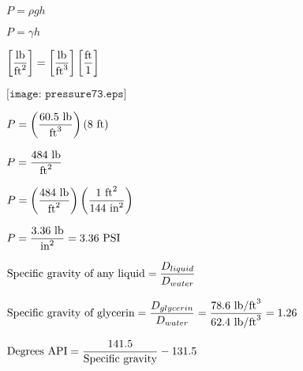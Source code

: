 \documentclass[12pt,a4paper,margin=2cm]{book}
\def\lthtmlcheckvsize{\ifdim\ht\sizebox<\vsize 
  \ifdim\wd\sizebox<\hsize\expandafter\hfill\fi \expandafter\vfill
  \else\expandafter\vss\fi}%
\begin{document}
{\newpage\clearpage
{}%
$\displaystyle P = \rho g h$%
\lthtmlindisplaymathZ
\lthtmlcheckvsize\clearpage}

{\newpage\clearpage
{}%
$\displaystyle P = \gamma h$%
\lthtmlindisplaymathZ
\lthtmlcheckvsize\clearpage}

{\newpage\clearpage
{}%
$\displaystyle \left[\hbox{lb} \over \hbox{ft}^2\right] = \left[ \hbox{lb} \over \hbox{ft}^3 \right] \left[\hbox{ft} \over 1 \right]$%
\lthtmlindisplaymathZ
\lthtmlcheckvsize\clearpage}

{\newpage\clearpage
{}%
$\displaystyle \texttt{[image: pressure73.eps]}$%
\lthtmlindisplaymathZ
\lthtmlcheckvsize\clearpage}

{\newpage\clearpage
{}%
$\displaystyle P = \left({60.5 \hbox{ lb} \over \hbox{ft}^3}\right) \left(8 \hbox{ ft}\right)$%
\lthtmlindisplaymathZ
\lthtmlcheckvsize\clearpage}

{\newpage\clearpage
{}%
$\displaystyle P = {484 \hbox{ lb} \over \hbox{ft}^2}$%
\lthtmlindisplaymathZ
\lthtmlcheckvsize\clearpage}

{\newpage\clearpage
{}%
$\displaystyle P = \left({484 \hbox{ lb} \over \hbox{ft}^2}\right) \left({1 \hbox{ ft}^2 \over 144 \hbox{ in}^2}\right) $%
\lthtmlindisplaymathZ
\lthtmlcheckvsize\clearpage}

{\newpage\clearpage
{}%
$\displaystyle P = {3.36 \hbox{ lb} \over \hbox{in}^2} = 3.36 \hbox{ PSI}$%
\lthtmlindisplaymathZ
\lthtmlcheckvsize\clearpage}

{\newpage\clearpage
{}%
$\displaystyle \hbox{Specific gravity of any liquid} = {D_{liquid} \over D_{water}}$%
\lthtmlindisplaymathZ
\lthtmlcheckvsize\clearpage}

{\newpage\clearpage
{}%
$\displaystyle \hbox{Specific gravity of glycerin} = {D_{glycerin} \over D_{water}} = { 78.6 \hbox{ lb/ft}^3 \over 62.4 \hbox{ lb/ft}^3} = 1.26 $%
\lthtmlindisplaymathZ
\lthtmlcheckvsize\clearpage}

{\newpage\clearpage
{}%
$\displaystyle \hbox{Degrees API} = {141.5 \over \hbox{Specific gravity}} - 131.5$%
\lthtmlindisplaymathZ
\lthtmlcheckvsize\clearpage}
\end{document}
